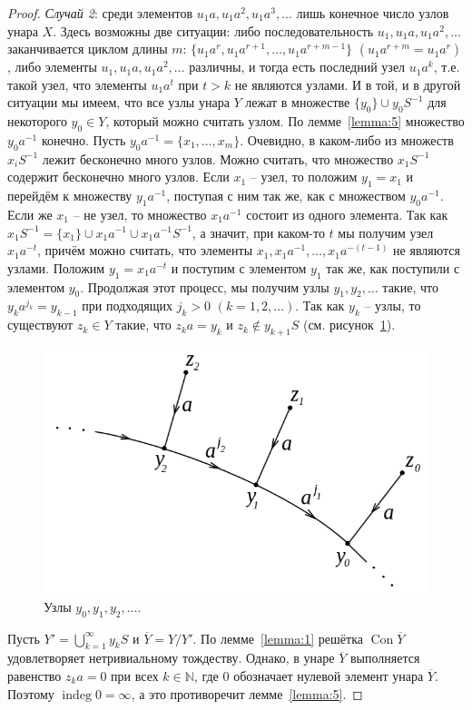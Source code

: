 \documentclass[11pt,twoside,final
]{article}
\def\Con{\operatorname{Con}}
\def\indeg{\operatorname{indeg}}
\begin{document}
\begin{proof}
	\textit{Случай 2}: среди элементов $u_{1}a,u_{1}a^{2},u_{1}a^{3},\ldots$ лишь конечное число узлов унара $X$.
	Здесь возможны две ситуации: либо последовательность $u_1, u_1 a, u_1 a^2, \ldots$ заканчивается циклом длины $m$: $\{ u_1 a^r, u_1 a^{r + 1}, \ldots, u_1 a^{r + m - 1} \}$ $(u_1 a^{r + m} = u_1 a^r)$, либо элементы $u_1, u_1 a, u_1 a^2, \ldots$ различны, и тогда есть последний узел $u_1 a^k$, т.е. такой узел, что элементы $u_1 a^t$ при $t > k$ не являются узлами.
	И в той, и в другой ситуации мы имеем, что все узлы унара $Y$ лежат в множестве $\{ y_0 \} \cup y_0 S^{-1}$ для некоторого $y_0 \in Y$, который можно считать узлом.
	По лемме~\ref{lemma:5} множество $y_0 a^{-1}$ конечно.
	Пусть $y_0 a^{-1} = \{ x_1, \ldots, x_m \}$.
	Очевидно, в каком-либо из множеств $x_i S^{-1}$ лежит бесконечно много узлов.
	Можно считать, что множество $x_1 S^{-1}$ содержит бесконечно много узлов.
	Если $x_1$ -- узел, то положим $y_1 = x_1$ и перейдём к множеству $y_1 a^{-1}$, поступая с ним так же, как с множеством $y_0 a^{-1}$.
	Если же $x_1$ -- не узел, то множество $x_1 a^{-1}$ состоит из одного элемента.
	Так как $x_1 S^{-1} = \{ x_1 \} \cup x_1 a^{-1} \cup x_1 a^{-1} S^{-1} $, а значит, при каком-то $t$ мы получим узел $x_1 a^{-t}$, причём можно считать, что элементы $x_1, x_1 a^{-1}, \ldots, x_1 a^{-(t-1)}$ не являются узлами.
	Положим $y_1 = x_1 a^{-t}$ и поступим с элементом $y_1$ так же, как поступили с элементом $y_0$.
	Продолжая этот процесс, мы получим узлы $y_1,y_2,\ldots$ такие, что $y_k a^{j_k} = y_{k - 1}$ при подходящих $j_k > 0$ $(k = 1,2,\ldots)$.
	Так как $y_k$ -- узлы, то существуют $z_k \in Y$ такие, что $z_k a = y_k$ и $z_k \notin y_{k + 1}S$ (см. рисунок~\ref{fig:uzly_4}).
	\begin{figure}[ht!]
		\centering
		\includegraphics[scale=0.6]{img/uzly_4.png}
		\caption{Узлы $y_0, y_1, y_2, \ldots$.}
		\label{fig:uzly_4}
	\end{figure}
	Пусть $Y' = \bigcup_{k=1}^{\infty} y_k S$ и $\overline{Y} = Y / Y'$.
	По лемме~\ref{lemma:1} решётка $\Con \overline{Y}$ удовлетворяет нетривиальному тождеству.
	Однако, в унаре $\overline{Y}$ выполняется равенство $z_k a = 0$ при всех $k \in \mathbb{N}$, где $0$ обозначает нулевой элемент унара $\overline{Y}$.
	Поэтому $\indeg 0 = \infty$, а это противоречит лемме~\ref{lemma:5}.
\end{proof}
\end{document}
